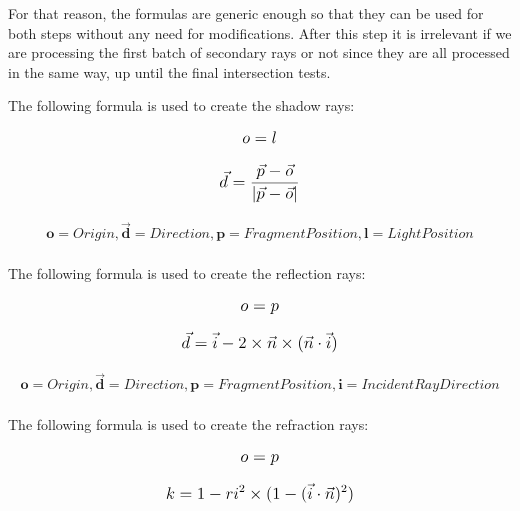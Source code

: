 \medskip

For that reason, the formulas are generic enough so that they can be used for both steps without any need for modifications. After this step it is irrelevant if we are processing the first batch of secondary rays or not since they are all processed in the same way, up until the final intersection tests.

\medskip

The following formula is used to create the shadow rays:

\begin{equation}
    \mathlarger{o = l}
\end{equation}

\begin{equation}
    \mathlarger{\vec{d} = \frac{ \vec{p} - \vec{o} }
                               {|\vec{p} - \vec{o}|}}
\end{equation}                 

\begin{align*}
    \textbf{o} = Origin, \mathbf{\vec{d}} = Direction,                     
    \textbf{p} = Fragment Position,
    \textbf{l} = Light Position\\
\end{align*}
            
The following formula is used to create the reflection rays:

\begin{equation}
    \mathlarger{o = p}
\end{equation}

\begin{equation}
    \mathlarger{\vec{d} = \vec{i} - 2 \times \vec{n} \times (\vec{n} \cdot \vec{i})}
\end{equation}

\begin{align*}
    \textbf{o} = Origin, \mathbf{\vec{d}} = Direction,                     
    \textbf{p} = Fragment Position,
    \textbf{i} = Incident Ray Direction\\
\end{align*}


The following formula is used to create the refraction rays:

\begin{equation}
    \mathlarger{o = p}
\end{equation}  

\begin{equation}
    \mathlarger{k = 1 - ri^{2} \times (1 - (\vec{i} \cdot \vec{n})^{2})}
\end{equation}  

